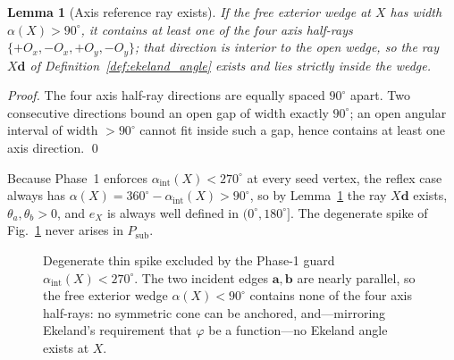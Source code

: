 \documentclass[10pt]{article}
\theoremstyle{plain}
\newtheorem{lemma}[theorem]{Lemma}
\theoremstyle{definition}
\begin{document}
\begin{lemma}[Axis reference ray exists]
\label{lem:axis_exists}
If the free exterior wedge at $X$ has width $\alpha(X)>90^\circ$, it contains at
least one of the four axis half-rays $\{+O_x,-O_x,+O_y,-O_y\}$; that direction is
interior to the open wedge, so the ray $X\mathbf{d}$ of
Definition~\ref{def:ekeland_angle} exists and lies strictly inside the wedge.
\end{lemma}
\begin{proof}
The four axis half-ray directions are equally spaced $90^\circ$ apart. Two
consecutive directions bound an open gap of width exactly $90^\circ$; an open
angular interval of width ${>}90^\circ$ cannot fit inside such a gap, hence
contains at least one axis direction. \qed
\end{proof}

\noindent Because Phase~1 enforces $\alpha_{\mathrm{int}}(X)<270^\circ$ at every
seed vertex, the reflex case always has
$\alpha(X)=360^\circ-\alpha_{\mathrm{int}}(X)>90^\circ$, so by
Lemma~\ref{lem:axis_exists} the ray $X\mathbf{d}$ exists, $\theta_a,\theta_b>0$,
and $e_X$ is always well defined in $(0^\circ,180^\circ]$. The degenerate spike
of Fig.~\ref{fig:spike} never arises in $P_{\mathrm{sub}}$.

\begin{figure}[htbp]
  \centering
  \caption{Degenerate thin spike excluded by the Phase-1 guard
    $\alpha_{\mathrm{int}}(X)<270^\circ$. The two incident edges
    $\mathbf{a},\mathbf{b}$ are nearly parallel, so the free exterior wedge
    $\alpha(X)<90^\circ$ contains none of the four axis half-rays: no symmetric
    cone can be anchored, and---mirroring Ekeland's requirement that $\varphi$ be
    a function---no Ekeland angle exists at $X$.}
  \label{fig:spike}
\end{figure}
\end{document}
